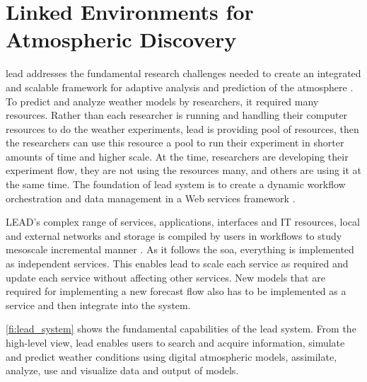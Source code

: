 \section{Linked Environments for Atmospheric Discovery}
\label{se:lead}

\acrfull{lead} addresses the fundamental research challenges needed to create an integrated and scalable framework for adaptive analysis and prediction of the atmosphere \cite{Droegemeier2005Service-OrientedWeather}. To predict and analyze weather models by researchers, it required many resources. Rather than each researcher is running and handling their computer resources to do the weather experiments, \acrshort{lead} is providing pool of resources, then the researchers can use this resource a pool to run their experiment in shorter amounts of time and higher scale. At the time, researchers are developing their experiment flow, they are not using the resources many, and others are using it at the same time. The foundation of \acrshort{lead} system is to create a dynamic workflow orchestration and data management in a Web services framework \cite{Droegemeier2005Service-OrientedWeather}.

LEAD's complex range of services, applications, interfaces and IT resources, local and external networks and storage is compiled by users in workflows to study mesoscale incremental manner \cite{Droegemeier2005Service-OrientedWeather}. As it follows the \acrshort{soa}, everything is implemented as independent services. This enables \acrshort{lead} to scale each service as required and update each service without affecting other services. New models that are required for implementing a new forecast flow also has to be implemented as a service and then integrate into the system.

\cref{fi:lead_system} shows the fundamental capabilities of the \acrshort{lead} system. From the high-level view, \acrshort{lead} enables users to search and acquire information, simulate and predict weather conditions using digital atmospheric models, assimilate, analyze, use and visualize data and output of models.

